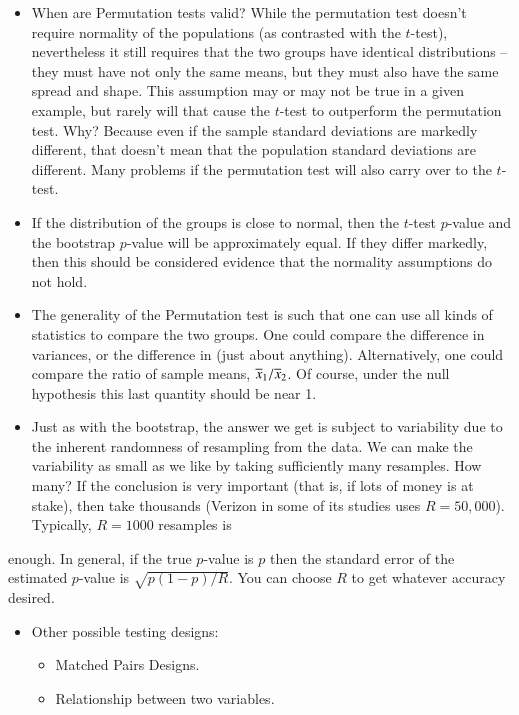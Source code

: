 \documentclass[captions=tableheading]{scrbook}
\begin{document}
\begin{itemize}
\item When are Permutation tests valid? While the permutation test doesn't require normality of the populations (as contrasted with the $t$-test), nevertheless it still requires that the two groups have identical distributions -- they must have not only the same means, but they must also have the same spread and shape. This assumption may or may not be true in a given example, but rarely will that cause the $t$-test to outperform the permutation test. Why? Because even if the sample standard deviations are markedly different, that doesn't mean that the population standard deviations are different. Many problems if the permutation test will also carry over to the $t$-test.
\item If the distribution of the groups is close to normal, then the $t$-test $p$-value and the bootstrap $p$-value will be approximately equal. If they differ markedly, then this should be considered evidence that the normality assumptions do not hold.
\item The generality of the Permutation test is such that one can use all kinds of statistics to compare the two groups. One could compare the difference in variances, or the difference in (just about anything). Alternatively, one could compare the ratio of sample means, $\overline{x}_{1}/\overline{x}_{2}$. Of course, under the null hypothesis this last quantity should be near 1.
\item Just as with the bootstrap, the answer we get is subject to variability due to the inherent randomness of resampling from the data. We can make the variability as small as we like by taking sufficiently many resamples. How many? If the conclusion is very important (that is, if lots of money is at stake), then take thousands (Verizon in some of its studies uses $R=50,000$). Typically, $R=1000$ resamples is
\end{itemize}
enough. In general, if the true $p$-value is $p$ then the standard error of the estimated $p$-value is $\sqrt{p(1-p)/R}$. You can choose $R$ to get whatever accuracy desired. 


\begin{itemize}
\item Other possible testing designs:
\begin{itemize}
\item Matched Pairs Designs.
\item Relationship between two variables.
\end{itemize}
\end{itemize}
\end{document}
